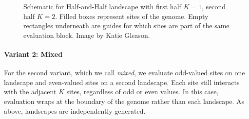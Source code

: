 \begin{figure}
    \centering
    \caption{Schematic for Half-and-Half landscape with first half $K=1$, second half $K=2$. Filled boxes represent sites of the genome. Empty rectangles underneath are guides for which sites are part of the same evaluation block. Image by Katie Gleason.}
    \label{fig:method:half}
\end{figure}


\paragraph{Variant 2: Mixed}
For the second variant, which we call \textit{mixed}, we evaluate odd-valued sites on one landscape and even-valued sites on a second landscape. Each site still interacts with the adjacent $K$ sites, regardless of odd or even values. In this case, evaluation wraps at the boundary of the genome rather than each landscape. As above, landscapes are independently generated.

